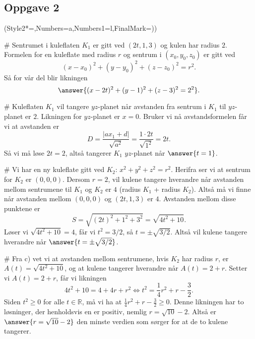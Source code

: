 \subsection*{Oppgave 2}
\begin{easylist}[enumerate]
\ListProperties(Style2*=,Numbers=a,Numbers1=l,FinalMark={)})

# Sentrumet i kuleflaten $K_1$ er gitt ved $(2t,1,3)$ og kulen har radius $2$. 
Formelen for en kuleflate med radius $r$ og sentrum i $(x_0,y_0,z_0)$ er gitt ved 
\begin{equation*}
	(x-x_0)^2+(y-y_0)^2+(z-z_0)^2=r^2.
\end{equation*}
Så for vår del blir likningen 
\begin{equation*}
	\answer{(x-2t)^2+(y-1)^2+(z-3)^2=2^2}.
\end{equation*}

# Kuleflaten $K_1$ vil tangere $yz$-planet når avstanden fra sentrum i $K_1$ til $yz$-planet er $2$. 
Likningen for $yz$-planet er $x=0$. 
Bruker vi nå avstandsformelen får vi at avstanden er
\begin{equation*}
	D=\frac{|ax_1+d|}{\sqrt{a^2}} = \frac{1\cdot2t}{\sqrt{1^2}}=2t.
\end{equation*}
Så vi må løse $2t=2$, altså tangerer $K_1$ $yz$-planet når $\answer{t=1}$.

# Vi har en ny kuleflate gitt ved $K_2:\, x^2+y^2+z^2=r^2$. 
Herifra ser vi at sentrum for $K_2$ er $(0,0,0)$. 
Dersom $r=2$, vil kulene tangere hverandre når avstanden mellom sentrumene til $K_1$ og $K_2$ er $4$ (radius $K_1$ + radius $K_2$). 
Altså må vi finne når avstanden mellom $(0,0,0)$ og $(2t,1,3)$ er $4$. 
Avstanden mellom disse punktene er 
\begin{equation*}
	S=\sqrt{(2t)^2+1^2+3^2}=\sqrt{4t^2+10}.
\end{equation*}
Løser vi $\sqrt{4t^2+10}=4$, får vi $t^2= 3 / 2$, så $t=\pm \sqrt{3 / 2}$. Altså vil kulene tangere hverandre når $\answer{t= \pm \sqrt{3/2}}$. 


# Fra c) vet vi at avstanden mellom sentrumene, hvis $K_2$ har radius $r$, er $A(t)=\sqrt{4t^2+10}$, og at kulene tangerer hverandre når $A(t)=2+r$. 
Setter vi $A(t)=2+r$, får vi likningen 
\begin{equation*}
	4t^2+10=4+4r+r^2 \Longleftrightarrow t^2 = \frac14r^2+r-\frac{3}{2}.
\end{equation*}
Siden $t^2\geq0$ for alle $t \in \mathbb{R}$, må vi ha at $\frac14r^2+r-\frac{3}{2}\geq0$. 
Denne likningen har to løsninger, der henholdsvis en er positiv, nemlig $r=\sqrt{10}-2$. 
Altså er $\answer{r=\sqrt{10}-2}$ den minste verdien som sørger for at de to kulene tangerer.
\end{easylist}


